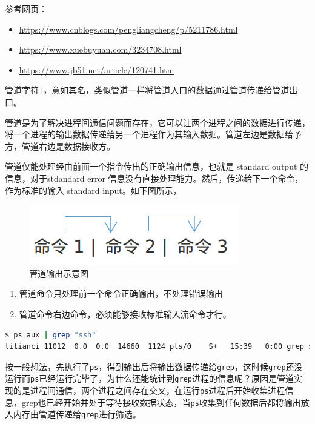 \documentclass[doctor,openright,twoside]{sjtuthesis}
\providecommand{\tightlist}{%
    \setlength{\itemsep}{0pt}\setlength{\parskip}{0pt}}
\newcommand{\passthrough}[1]{#1}
\theoremstyle{plain}
\theoremstyle{definition}
\theoremstyle{remark}
\theoremstyle{ocrenumbox}
\theoremstyle{plain}
\begin{document}
参考网页：

\begin{itemize}
\tightlist
\item
  \url{https://www.cnblogs.com/pengliangcheng/p/5211786.html}
\item
  \url{https://www.xuebuyuan.com/3234708.html}
\item
  \url{https://www.jb51.net/article/120741.htm}
\end{itemize}

管道字符\passthrough{\lstinline!|!}，意如其名，类似管道一样将管道入口的数据通过管道传递给管道出口。

管道是为了解决进程间通信问题而存在，它可以让两个进程之间的数据进行传递，将一个进程的输出数据传递给另一个进程作为其输入数据。管道左边是数据给予方，管道右边是数据接收方。

管道仅能处理经由前面一个指令传出的正确输出信息，也就是 standard output 的信息，对于stdandard error 信息没有直接处理能力。然后，传递给下一个命令，作为标准的输入 standard input。如下图所示，

\begin{figure}
\includegraphics{shell-pipe} \caption[管道输出示意图]{管道输出示意图}\label{fig:shell-pipe}
\end{figure}

\begin{enumerate}
\def\labelenumi{\arabic{enumi}.}
\tightlist
\item
  管道命令只处理前一个命令正确输出，不处理错误输出
\item
  管道命令右边命令，必须能够接收标准输入流命令才行。
\end{enumerate}

\begin{lstlisting}[language=bash]
$ ps aux | grep "ssh"
litianci 11012  0.0  0.0  14660  1124 pts/0    S+   15:39   0:00 grep ssh
\end{lstlisting}

按一般想法，先执行了\passthrough{\lstinline!ps!}，得到输出后将输出数据传递给\passthrough{\lstinline!grep!}，这时候\passthrough{\lstinline!grep!}还没运行而\passthrough{\lstinline!ps!}已经运行完毕了，为什么还能统计到\passthrough{\lstinline!grep!}进程的信息呢？原因是管道实现的是进程间通信，两个进程之间存在交叉，在运行\passthrough{\lstinline!ps!}进程后开始收集进程信息，grep也已经开始并处于等待接收数据状态，当\passthrough{\lstinline!ps!}收集到任何数据后都将输出放入内存由管道传递给\passthrough{\lstinline!grep!}进行筛选。
\end{document}
